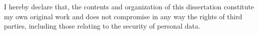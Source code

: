 
\begin{declaration}

I hereby declare that, the contents and organization of this dissertation constitute my own original work and does not compromise in any way the rights of third parties, including those relating to the security of personal data.


\end{declaration}

